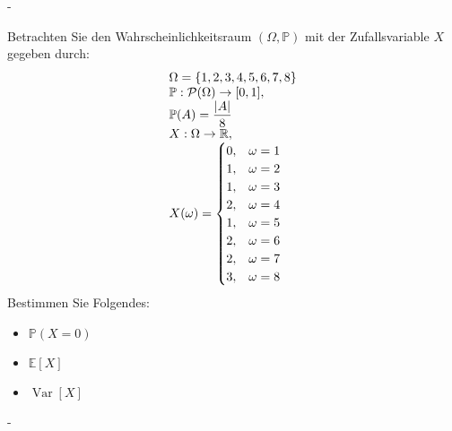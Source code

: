\documentclass{article}
\begin{document}
\begin{solution}
-
\end{solution}

\newpage

\begin{problem}
Betrachten Sie den Wahrscheinlichkeitsraum $(\Omega, \mathbb{P})$ mit der Zufallsvariable $X$ gegeben durch:
\[
\begin{array}{>{\displaystyle}l}
\Omega = \{1, 2, 3, 4, 5, 6, 7, 8\} \\
\mathbb{P}: \mathcal{P}(\Omega) \to [0, 1], \\
\mathbb{P}(A) = \frac{|A|}{8} \\
X: \Omega \to \mathbb{R}, \\
X(\omega) = \begin{cases}
0, & \omega = 1 \\
1, & \omega = 2 \\
1, & \omega = 3 \\
2, & \omega = 4 \\
1, & \omega = 5 \\
2, & \omega = 6 \\
2, & \omega = 7 \\
3, & \omega = 8 \\
\end{cases}
\end{array}
\]
Bestimmen Sie Folgendes:
\begin{itemize}
\item $\mathbb{P}(X = 0)$
\item $\mathbb{E}[X]$
\item $\operatorname{Var}[X]$
\end{itemize}
\end{problem}

\begin{solution}
-
\end{solution}

\newpage
\end{document}

